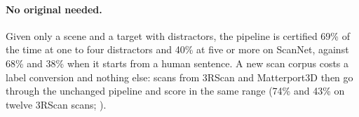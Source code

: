 \paragraph{No original needed.}
Given only a scene and a target with distractors, the pipeline is certified 69\% of the time at one to four distractors and 40\% at five or more on ScanNet, against 68\% and 38\% when it starts from a human sentence.
A new scan corpus costs a label conversion and nothing else: scans from 3RScan and Matterport3D then go through the unchanged pipeline and score in the same range (74\% and 43\% on twelve 3RScan scans; ).

